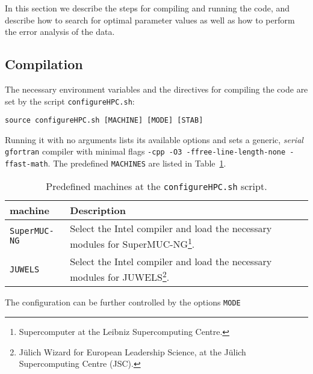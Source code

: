


In this section we describe the steps for compiling and running the code, and describe how to search for optimal parameter values as well as how to perform the error analysis of the data.

\subsection{Compilation}
\label{sec:compilation}

The necessary environment variables and the directives for compiling the code are set by the script \texttt{configureHPC.sh}:
\begin{lstlisting}[style=bash]
source configureHPC.sh [MACHINE] [MODE] [STAB]
\end{lstlisting}
Running it with no arguments lists its available options and sets a generic, \emph{serial} \texttt{gfortran} compiler with minimal flags \texttt{-cpp -O3 -ffree-line-length-none -ffast-math}. The predefined \texttt{MACHINES} are listed in Table~\ref{table:machines}.

\begin{table}[h]
	\begin{tabular}{@{} l l @{}}\toprule
		machine & Description \\\midrule
		\texttt{SuperMUC-NG}  &  Select the Intel compiler and load the necessary modules for SuperMUC-NG\footnote{Supercomputer at the Leibniz Supercomputing Centre.}. \\
		\texttt{JUWELS}  &  Select the Intel compiler and load the necessary modules for JUWELS\footnote{J\"ulich Wizard for European Leadership Science, at the J\"ulich Supercomputing Centre (JSC).}.\\\bottomrule
	\end{tabular}
	\caption{Predefined machines at the \texttt{configureHPC.sh} script.} \label{table:machines}
\end{table}

The configuration can be further controlled by the options \texttt{MODE}



